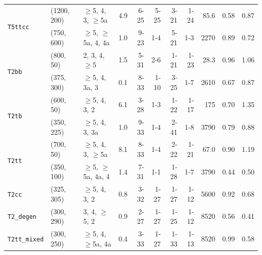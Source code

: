 \begin{table}[!t]
\begin{tabular}{ lllcrrrrrcc }
    \multirow{2}{*}{\texttt{T5ttcc}}  
  & (1200, 200) & $\geq$5, 4, 3, $\geq$5a  & \phantom{1}4.9 & 6-25  & 5-25    & 3-21  & 1-24 & 85.6 & 0.58 & 0.87 \\
  & (750, 600)  & $\geq$5, $\geq$5a, 4, 4a & \phantom{1}1.0 & 9-23  & 1-4     & 5-21  & 1-3  & 2270 & 0.89 & 0.72 \\ [0.5ex]
    \multirow{2}{*}{\texttt{T2bb}}
  & (800, 50)   & 2, 3, 4, $\geq$5         & \phantom{1}1.5 & 5-31  & 2-6     & 1-21  & 1-23 & 28.3 & 0.96 & 1.06 \\
  & (375, 300)  & $\geq$5, 4, 3a, 3        & \phantom{1}0.1 & 8-33  & 1-10    & 3-25  & 1-7  & 2610 & 0.67 & 0.87 \\ [0.5ex]
    \multirow{2}{*}{\texttt{T2tb}}
  & (600, 50)   & $\geq$5, 4, 3, 2         & \phantom{1}6.1 & 3-28  & 1-3     & 1-22  & 1-17 & 175  & 0.70 & 1.35 \\
  & (350, 225)  & $\geq$5, 4, 3, 3a        & \phantom{1}1.0 & 9-33  & 1-4     & 2-41  & 1-8  & 3790 & 0.79 & 0.88 \\ [0.5ex]
    \multirow{2}{*}{\texttt{T2tt}}
  & (700, 50)   & $\geq$5, 4, 3, $\geq$5a  & \phantom{1}8.1 & 8-33  & 1-4     & 2-22  & 1-21 & 67.0 & 0.90 & 1.19 \\
  & (350, 100)  & $\geq$5, $\geq$5a, 4a, 4 & \phantom{1}1.4 & 7-31  & 1-1     & 1-28  & 1-7  & 3790 & 0.44 & 0.50 \\ [0.5ex]
    \multirow{1}{*}{\texttt{T2cc}}
  & (325, 305)  & $\geq$5, 4, 3, 2         & \phantom{1}0.8 & 3-32  & 1-27    & 1-27  & 1-12 & 5600 & 0.92 & 0.68 \\ [0.5ex]
    \multirow{1}{*}{\texttt{T2\_degen}}
  & (300, 290)  & 3, 4, $\geq$5, 2         & \phantom{1}0.9 & 2-27  & 1-27    & 1-25  & 1-12 & 8520 & 0.56 & 0.41 \\ [0.5ex]
    \multirow{1}{*}{\texttt{T2tt\_mixed}}
  & (300, 250)  & $\geq$5, 4, $\geq$5a, 4a & \phantom{1}0.4 & 3-33  & 1-27    & 1-33  & 1-13 & 8520 & 0.99 & 0.58 \\ [0.5ex]
    \hline
  \end{tabular}
\end{table}

